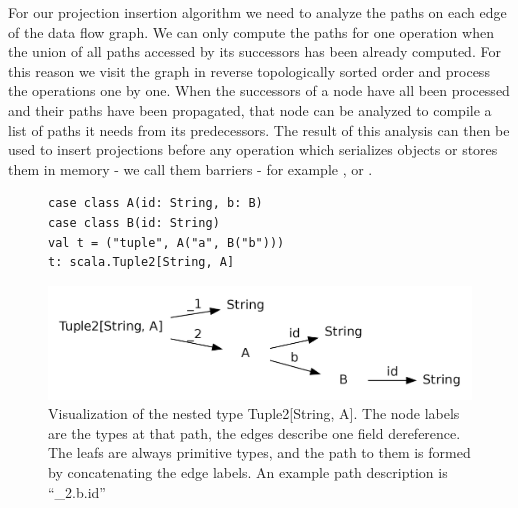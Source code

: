 For our projection insertion algorithm we need to analyze the paths on each edge of the data flow graph. We can only compute the paths for one operation when the union of all paths accessed by its successors has been already computed. For this reason we visit the graph in reverse topologically sorted order and process the operations one by one. When the successors of a node have all been processed and their paths have been propagated, that node can be analyzed to compile a list of paths it needs from its predecessors. The result of this analysis can then be used to insert projections before any operation which serializes objects or stores them in memory - we call them barriers - for example ,  or .

\begin{figure}
\begin{lstlisting}[name=code, caption=Nested type for paths example., captionpos=b, label=lst:types]
case class A(id: String, b: B)
case class B(id: String)  
val t = ("tuple", A("a", B("b"))) 
t: scala.Tuple2[String, A]
\end{lstlisting}
\centering
\includegraphics[clip=true, width=0.95\columnwidth]{dot/access.png}
\caption{Visualization of the nested type Tuple2[String, A]. The node labels are the types at that path, the edges describe one field dereference. The leafs are always primitive types, and the path to them is formed by concatenating the edge labels. An example path description is ``\_2.b.id''}
\label{fig:type_tree}
\end{figure}


